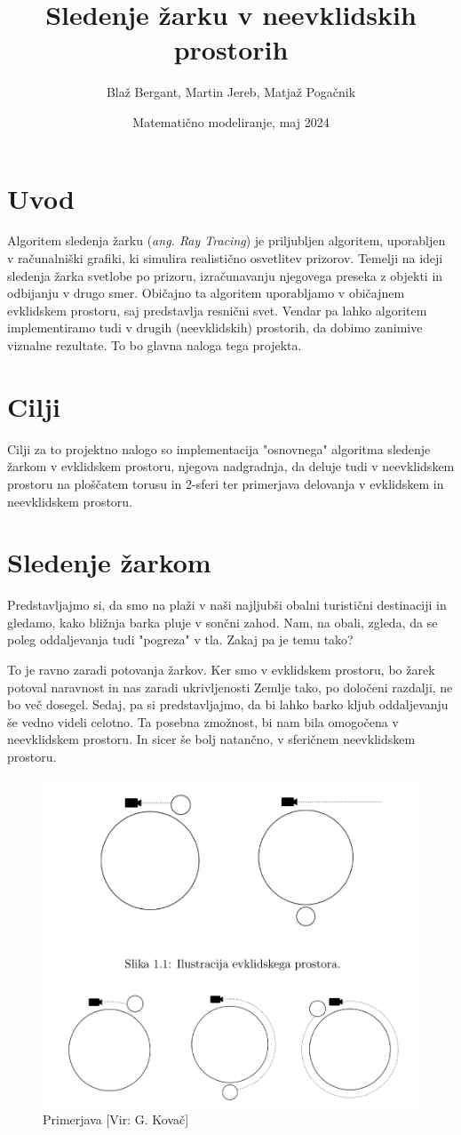\documentclass[titlepage]{article}
\title{Sledenje žarku v neevklidskih prostorih}
\author{Blaž Bergant, Martin Jereb, Matjaž Pogačnik}
\date{Matematično modeliranje, maj 2024}
\begin{document}
\maketitle
\newpage
\tableofcontents
\newpage

\section{Uvod}
Algoritem sledenja žarku (\textit{ang. Ray Tracing}) je priljubljen algoritem, uporabljen v računalniški grafiki, ki simulira realistično osvetlitev prizorov. Temelji na ideji sledenja žarka svetlobe po prizoru, izračunavanju njegovega preseka z objekti in odbijanju v drugo smer. Običajno ta algoritem uporabljamo v običajnem evklidskem prostoru, saj predstavlja resnični svet. Vendar pa lahko algoritem implementiramo tudi v drugih (neevklidskih) prostorih, da dobimo zanimive vizualne rezultate. To bo glavna naloga tega projekta.

\section{Cilji}
Cilji za to projektno nalogo so implementacija "osnovnega" algoritma sledenje žarkom v evklidskem prostoru, njegova nadgradnja, da deluje tudi v neevklidskem prostoru na ploščatem torusu in 2-sferi ter primerjava delovanja v evklidskem in neevklidskem prostoru.

\section{Sledenje žarkom}
Predstavljajmo si, da smo na plaži v naši najljubši obalni turistični destinaciji in gledamo, kako bližnja barka pluje v sončni zahod. Nam, na obali, zgleda, da se poleg oddaljevanja tudi "pogreza" v tla. Zakaj pa je temu tako? 

To je ravno zaradi potovanja žarkov. Ker smo v evklidskem prostoru, bo žarek potoval naravnost in nas zaradi ukrivljenosti Zemlje tako, po določeni razdalji, ne bo več dosegel. Sedaj, pa si predstavljajmo, da bi lahko barko kljub oddaljevanju še vedno videli celotno. Ta posebna zmožnost, bi nam bila omogočena v neevklidskem prostoru. In sicer še bolj natančno, v sferičnem neevklidskem prostoru.

\begin{figure}[H]
    \centering
    \includegraphics[width=0.5\linewidth]{Images/potovanje_zarkov.png}
    \caption{Primerjava [Vir: G. Kovač]}
    \label{Slika:Primerjava}
\end{figure}
\end{document}
